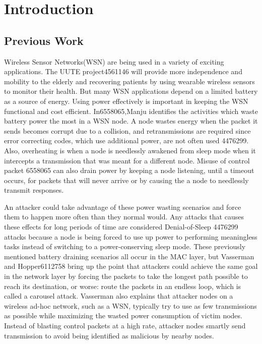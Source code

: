 \section{Introduction}
\subsection{Previous Work}
Wireless Sensor Networks(WSN) are being used in a variety of exciting 
applications. The UUTE project{4561146} will provide more independence 
and mobility to the elderly and recovering patients by using wearable 
wireless sensors to monitor their health. But many WSN applications 
depend on a limited battery as a source of energy.  Using power 
effectively is important in keeping the WSN functional and cost efficient.
 In{6558065},Manju identifies the activities which waste battery power 
the most in a WSN node.  A node wastes energy when the packet it sends 
becomes corrupt due to a collision, and retransmissions are required 
since error correcting codes, which use additional power, are not 
often used {4476299}. Also, overheating is when a node is needlessly 
awakened from sleep mode when it intercepts a transmission that was 
meant for a different node.  Misuse of control packet {6558065} can 
also drain power by keeping a node listening, until a timeout occurs, 
for packets that will never arrive or by causing the a node to needlessly 
transmit responses.
	

An attacker could take advantage of these power wasting scenarios and 
force them to happen more often than they normal would.  Any attacks 
that causes these effects for long periods of time are considered 
Denial-of-Sleep {4476299} attacks because a node is being forced to 
use up power to performing meaningless tasks instead of switching to 
a power-conserving sleep mode. These previously mentioned battery draining
 scenarios all occur in the MAC layer, but Vasserman and Hopper{6112758} 
bring up the point that attackers could achieve the same goal in the 
network layer by forcing the packets to take the longest path possible 
to reach its destination, or worse: route the packets in an endless loop, 
which is called a carousel attack.  Vasserman also explains that attacker 
nodes on a wireless ad-hoc network, such as a WSN, typically try to use 
as few transmissions as possible while maximizing the wasted power 
consumption of victim nodes. Instead of blasting control packets at a 
high rate, attacker nodes smartly send transmission to avoid being 
identified as malicious by nearby nodes.

